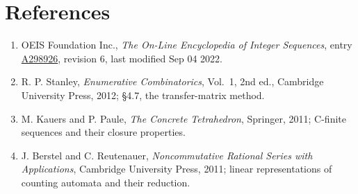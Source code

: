 \documentclass[11pt]{article}
\theoremstyle{definition}
\begin{document}
\section{References}

\begin{enumerate}

\item OEIS Foundation Inc., \emph{The On-Line Encyclopedia of Integer Sequences}, entry \href{https://oeis.org/A298926}{A298926}, revision 6, last modified Sep 04 2022.

\item R. P. Stanley, \emph{Enumerative Combinatorics}, Vol.~1, 2nd ed., Cambridge University Press, 2012; \S4.7, the transfer-matrix method.

\item M. Kauers and P. Paule, \emph{The Concrete Tetrahedron}, Springer, 2011; C-finite sequences and their closure properties.

\item J. Berstel and C. Reutenauer, \emph{Noncommutative Rational Series with Applications}, Cambridge University Press, 2011; linear representations of counting automata and their reduction.

\end{enumerate}
\end{document}
